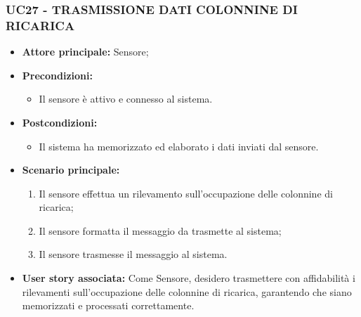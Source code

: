 \subsubsection{UC27 - TRASMISSIONE DATI COLONNINE DI RICARICA}
\begin{itemize}
    \item \textbf{Attore principale:} Sensore;
    \item \textbf{Precondizioni:}
        \begin{itemize}
            \item Il sensore è attivo e connesso al sistema. 
        \end{itemize}
    \item \textbf{Postcondizioni:}
        \begin{itemize}
            \item Il sistema ha memorizzato ed elaborato i dati inviati dal sensore.
        \end{itemize}
    \item \textbf{Scenario principale:}
        \begin{enumerate}
            \item Il sensore effettua un rilevamento sull'occupazione delle colonnine di ricarica;
            \item Il sensore formatta il messaggio da trasmette al sistema;
            \item Il sensore trasmesse il messaggio al sistema.
        \end{enumerate}
    \item \textbf{User story associata:}
    Come Sensore, desidero trasmettere con affidabilità i rilevamenti sull'occupazione delle colonnine di ricarica, garantendo che siano memorizzati e processati correttamente.
\end{itemize}